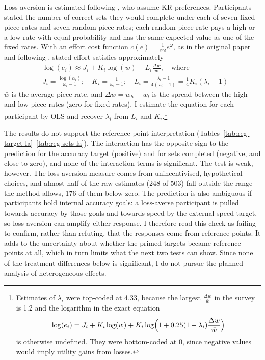 \documentclass[12pt, letterpaper]{article}
\begin{document}
Loss aversion is estimated following \textcite{campos-mercade.2024.gustibusdisputes}, who assume KR preferences. Participants stated the number of correct sets they would complete under each of seven fixed piece rates and seven random piece rates; each random piece rate pays a high or a low rate with equal probability and has the same expected value as one of the fixed rates. With an effort cost function $c(e) = \frac{1}{\alpha \omega} e^\omega$, as in the original paper and following \textcite{augenblick.2019.experimenttime}, stated effort satisfies approximately
\[
\begin{aligned}
& \log(e_i) \approx J_i + K_i \log(\bar{w}) - L_i \frac{\Delta w}{\bar w}, \quad \text{where} \\
& J_i = \frac {\log(\alpha_i)}{\omega_i - 1}; \quad K_i = \frac {1}{\omega_i - 1}; \quad L_i = \frac {\lambda_i -1}{4(\omega_i - 1)} = \frac {1}{4} K_i (\lambda_i -1)
\end{aligned}
\]
$\bar w$ is the average piece rate, and $\Delta w = w_h - w_l$ is the spread between the high and low piece rates (zero for fixed rates). I estimate the equation for each participant by OLS and recover $\lambda_i$ from $L_i$ and $K_i$.\footnote{Estimates of $\lambda_i$ were top-coded at 4.33, because the largest $\frac{\Delta w}{\bar w}$ in the survey is 1.2 and the logarithm in the exact equation
  \[
  \log(e_i) = J_i + K_i \log(\bar{w}) + K_i \log\Bigl(1 + 0.25 (1 - \lambda_i) \frac{\Delta w}{\bar w}\Bigr)
  \]
  is otherwise undefined. They were bottom-coded at 0, since negative values would imply utility gains from losses.}

The results do not support the reference-point interpretation (Tables~\ref{tab:reg-target-la}--\ref{tab:reg-sets-la}). The interaction has the opposite sign to the prediction for the accuracy target (positive) and for sets completed (negative, and close to zero), and none of the interaction terms is significant. The test is weak, however. The loss aversion measure comes from unincentivised, hypothetical choices, and almost half of the raw estimates (248 of 503) fall outside the range the method allows, 176 of them below zero. The prediction is also ambiguous if participants hold internal accuracy goals: a loss-averse participant is pulled towards accuracy by those goals and towards speed by the external speed target, so loss aversion can amplify either response. I therefore read this check as failing to confirm, rather than refuting, that the responses come from reference points. It adds to the uncertainty about whether the primed targets became reference points at all, which in turn limits what the next two tests can show. Since none of the treatment differences below is significant, I do not pursue the planned analysis of heterogeneous effects.
\end{document}
